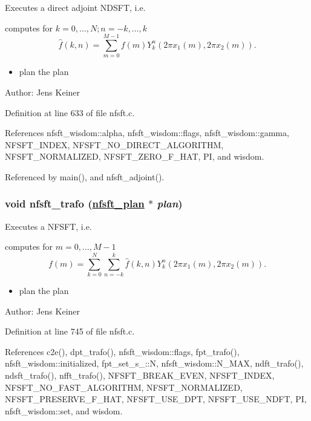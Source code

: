 Executes a direct adjoint NDSFT, i.e. 

computes for $k=0,\ldots,N; n=-k,\ldots,k$ \[ \hat{f}(k,n) = \sum_{m = 0}^{M-1} f(m) Y_k^n\left(2\pi x_1(m), 2\pi x_2(m)\right). \]

\begin{itemize}
\item plan the plan\end{itemize}
\begin{Desc}
\item[Author:]Jens Keiner \end{Desc}


Definition at line 633 of file nfsft.c.

References nfsft\_\-wisdom::alpha, nfsft\_\-wisdom::flags, nfsft\_\-wisdom::gamma, NFSFT\_\-INDEX, NFSFT\_\-NO\_\-DIRECT\_\-ALGORITHM, NFSFT\_\-NORMALIZED, NFSFT\_\-ZERO\_\-F\_\-HAT, PI, and wisdom.

Referenced by main(), and nfsft\_\-adjoint().\hypertarget{group__nfsft_ga8}{
\subsubsection[nfsft\_\-trafo]{\setlength{\rightskip}{0pt plus 5cm}void nfsft\_\-trafo (\hyperlink{structnfsft__plan}{nfsft\_\-plan} $\ast$ {\em plan})}}
\label{group__nfsft_ga8}


Executes a NFSFT, i.e. 

computes for $m = 0,\ldots,M-1$ \[ f(m) = \sum_{k=0}^N \sum_{n=-k}^k \hat{f}(k,n) Y_k^n\left(2\pi x_1(m), 2\pi x_2(m)\right). \]

\begin{itemize}
\item plan the plan\end{itemize}
\begin{Desc}
\item[Author:]Jens Keiner \end{Desc}


Definition at line 745 of file nfsft.c.

References c2e(), dpt\_\-trafo(), nfsft\_\-wisdom::flags, fpt\_\-trafo(), nfsft\_\-wisdom::initialized, fpt\_\-set\_\-s\_\-::N, nfsft\_\-wisdom::N\_\-MAX, ndft\_\-trafo(), ndsft\_\-trafo(), nfft\_\-trafo(), NFSFT\_\-BREAK\_\-EVEN, NFSFT\_\-INDEX, NFSFT\_\-NO\_\-FAST\_\-ALGORITHM, NFSFT\_\-NORMALIZED, NFSFT\_\-PRESERVE\_\-F\_\-HAT, NFSFT\_\-USE\_\-DPT, NFSFT\_\-USE\_\-NDFT, PI, nfsft\_\-wisdom::set, and wisdom.

